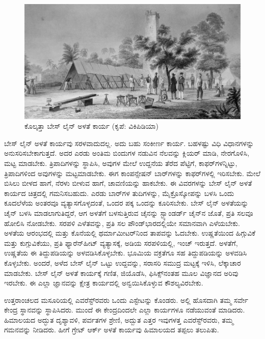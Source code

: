 \begin{figure}[!hbtp]
\includegraphics{"images/image014.jpg"}
\caption{ಕೊಲ್ಕತ್ತಾ ಬೇಸ್​ ಲೈನ್​ ಅಳತೆ ಕಾರ್ಯ (ಕೃಪೆ: ವಿಕಿಪಿಡಿಯಾ)}\label{art11-fig2}
\end{figure}

\newpage

ಬೇಸ್​ ಲೈನ್​ ಅಳತೆ ಕಾರ್ಯವು ಸರಳವಾದುದಲ್ಲ. ಅದು ಬಹು ಸಂಕೀರ್ಣ ಕಾರ್ಯ. ಬಹಳಷ್ಟು ವಿಧಿ ವಿಧಾನಗಳನ್ನು ಅನುಸರಿಸಬೇಕಾಗುತ್ತದೆ. ಅದರ ಎರಡು ಅಂತಿಮ ಬಿಂದುಗಳ ನಡುವಿನ ನೆಲವನ್ನು ಕ್ಲಿಯರ್​ ಮಾಡಿ, ನೇರಗೊಳಿಸಿ, ಮಟ್ಟ ಮಾಡಬೇಕು. ತ್ರಿಪಾದಿಗಳನ್ನು ಸ್ಥಾಪಿಸಿ, ಅವುಗಳ ಮೇಲೆ ಉದ್ದನೆಯ ತೆರೆದ ಪೆಟ್ಟಿಗೆ, ಕಾಫರ್​ಗಳನ್ನಿಟ್ಟು, ತ್ರಿಪಾದಿಗಳಿಂದ ಅವುಗಳನ್ನು ಮಟ್ಟಮಾಡಬೇಕು. ಈಗ ಕಾಂಪನ್ಸೇಷನ್​ ಬಾರ್​ಗಳನ್ನು ಕಾಫರ್​ಗಳಲ್ಲಿ ಇರಿಸಬೇಕು. ಮೇಲೆ ಬಿಸಿಲು ಬೀಳದ ಹಾಗೆ, ನೆರಳು ಬೀಳುವ ಹಾಗೆ, ಚಾವಣಿಯನ್ನು ಹಾಕಬೇಕು. ಈ ವಿವರಗಳನ್ನು ಬೇಸ್​ ಲೈನ್​ ಅಳತೆ ಕಾರ್ಯದ ಚಿತ್ರದಲ್ಲಿ ಗಮನಿಸಬಹುದು. ಎರಡು ಬಾರ್​ಗಳ ತುದಿಗಳನ್ನು, ಮೈಕ್ರೊಸ್ಕೋಪನ್ನು ಬಳಸಿ ಒಂದು ಕೂದಲೆಳೆಯ ಅಂತರವೂ ವ್ಯತ್ಯಾಸಗೊಳ್ಳದಂತೆ, ಒಂದರ ಪಕ್ಕ ಒಂದನ್ನು ಕೂರಿಸಬೇಕು. ಬೇಸ್​ ಲೈನ್​ ಅಳತೆಯನ್ನು ಚೈನ್​ ಬಳಸಿ ಮಾಡಲಾಗುತಿದ್ದರೆ, ಆಗ ಅಳತೆಗೆ ಬಳಸುತ್ತಿರುವ ಚೈನನ್ನು ಸ್ಟ್ಯಾಂಡರ್ಡ್ ಚೈನ್​ನ ಜೊತೆ, ಪ್ರತಿ ಸಲವೂ ಹೋಲಿಸಿ ನೋಡಬೇಕು. ಸರಪಳಿ ಎಳೆತವನ್ನು, ಪ್ರತಿ ಸಲ  ಪೌಂಡ್​ ಭಾರದಲ್ಲಿಯೇ ಸಮಾನವಾಗಿ ಎಳೆಯಬೇಕು. ಅಳತೆಯ ಆರಂಭದಲ್ಲಿ ಮತ್ತು ಕೊನೆಯಲ್ಲಿ ಥರ್ಮಾಮೀಟರ್​ನಿಂದ ತಾಪವನ್ನು ಓದಬೇಕು. ಉಷ್ಣತೆಯಿಂದ ಹಿಗ್ಗುವಿಕೆ ಮತ್ತು ಕುಗ್ಗುವಿಕೆಯು, ಪ್ರತಿ ಫ್ಯಾರೆನ್​ಹೀಟ್​ ವ್ಯತ್ಯಾಸಕ್ಕೆ,  ಅಡಿಯ ಸರಪಳಿಯಲ್ಲಿ,  ಇಂಚ್​ ಇರುತ್ತದೆ. ಅಳತೆಗೆ, ಉಷ್ಣತೆಯ ಈ ತಿದ್ದುಪಡಿಯನ್ನು ಅಳವಡಿಸಿಕೊಳ್ಳಬೇಕು. ಭೂಮಿಯ ವಕ್ರತೆಗೂ ಸಹ ತಿದ್ದುಪಡಿಯನ್ನು ಅಳವಡಿಸಿ ಕೊಳ್ಳಬೇಕು. ಅಂದರೆ, ಅಳೆದ ಬೇಸ್​ ಲೈನ್​ ಒಟ್ಟು ಉದ್ದವನ್ನು, ಸರಾಸರಿ ಸಮುದ್ರ ಮಟ್ಟಕ್ಕೆ ಇಳಿಸಿ, ಲೆಕ್ಕಾಚಾರ ಮಾಡಬೇಕು. ಬೇಸ್​ ಲೈನ್​ ಅಳತೆ ಕಾರ್ಯಕ್ಕೆ ಗಣಿತ, ಜಿಯೊಡೆಸಿ, ಫಿಸಿಕ್ಸ್​ ನಂತಹ ಮೂಲ ವಿಜ್ಞಾನದ ಅರಿವು ಇರಬೇಕು. ಈ ಎಲ್ಲಾ ಜ್ಞಾನವನ್ನು ಕ್ಷೇತ್ರ ಕಾರ್ಯದಲ್ಲಿ ಅನ್ವಯಿಸಿಕೊಳ್ಳುವ ಕೌಶಲ್ಯವಿರಬೇಕು.

ಉತ್ತರಾಂಚಲದ ಮಸೂರಿಯಲ್ಲಿ ಎವರೆಸ್ಟ್​ರವರು ಒಂದು ಎಸ್ಟೇಟನ್ನು ಕೊಂಡರು. ಅಲ್ಲಿ ಹೊಸದಾಗಿ ತಮ್ಮ ಸರ್ವೇ ಕೇಂದ್ರ ಸ್ಥಾನವನ್ನು ಸ್ಥಾಪಿಸಿದರು. ಮುಂದೆ ಈ ಕೇಂದ್ರದಿಂದಲೇ ಎಲ್ಲಾ ಕಾರ್ಯಗಳೂ ನಡೆಯುವಂತೆ ಮಾಡಿದರು. ಹಿಮಾಲಯದ ಅದ್ಭುತ ದೃಶ್ಯಾವಳಿ, ಪರ್ವತಗಳ ಶ್ರೇಣಿ, ಅದ್ಬುತ ಎತ್ತರ ಇವುಗಳತ್ತ ಎವರೆಸ್ಟ್​ರವರು, ತಮ್ಮ ಗಮನವನ್ನು ನೀಡಿದರು. ಹೀಗೆ ಗ್ರೇಟ್​ ಆರ್ಕ್ ಅಳತೆ ಕಾರ್ಯವು ಹಿಮಾಲಯದ ತಪ್ಪಲು ತಲುಪಿತು.

